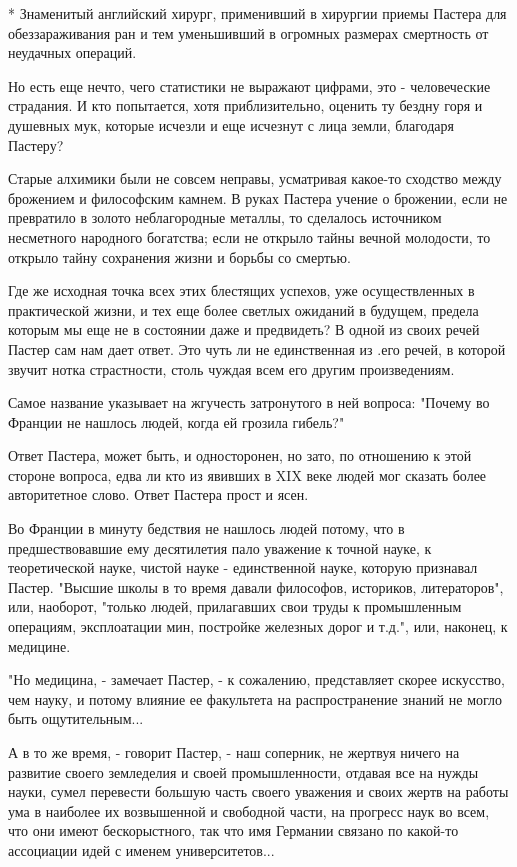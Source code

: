 * Знаменитый английский хирург, применивший в хирургии приемы Пастера
для обеззараживания ран и тем уменьшивший в огромных размерах
смертность от неудачных операций.

Но  есть  еще  нечто,  чего  статистики  не  выражают  цифрами,  это   -
человеческие страдания. И кто  попытается, хотя приблизительно,  оценить
ту бездну горя  и душевных мук,  которые исчезли и  еще исчезнут с  лица
земли, благодаря Пастеру?

Старые алхимики  были не  совсем неправы,  усматривая какое-то  сходство
между брожением и философским камнем. В руках Пастера учение о брожении,
если  не  превратило  в  золото  неблагородные  металлы,  то   сделалось
источником несметного народного богатства; если не открыло тайны  вечной
молодости, то открыло тайну сохранения жизни и борьбы со смертью.

Где же исходная точка всех этих блестящих успехов, уже осуществленных  в
практической жизни, и тех еще более светлых ожиданий в будущем,  предела
которым мы еще не в состоянии даже и предвидеть? В одной из своих  речей
Пастер сам нам дает ответ. Это чуть ли не единственная из .его речей,  в
которой  звучит  нотка  страстности,   столь  чуждая  всем  его   другим
произведениям.

Самое название указывает на жгучесть затронутого в ней вопроса:  "Почему
во Франции не нашлось людей, когда ей грозила гибель?"

Ответ Пастера, может быть, и односторонен, но зато, по отношению к  этой
стороне вопроса, едва  ли кто из  явивших в XIX  веке людей мог  сказать
более авторитетное слово. Ответ Пастера прост и ясен.

Во  Франции  в  минуту   бедствия  не  нашлось   людей  потому,  что   в
предшествовавшие  ему  десятилетия  пало  уважение  к  точной  науке,  к
теоретической  науке,  чистой  науке   -  единственной  науке,   которую
признавал Пастер. "Высшие школы в то время давали философов,  историков,
литераторов", или,  наоборот, "только  людей, прилагавших  свои труды  к
промышленным  операциям,  эксплоатации  мин,  постройке  железных  дорог
и т.д.", или, наконец, к медицине.

"Но медицина, - замечает Пастер, - к сожалению, представляет скорее
искусство, чем науку, и потому влияние ее факультета на
распространение знаний не могло быть ощутительным...

А в то же время, - говорит Пастер, - наш соперник, не жертвуя ничего
на развитие своего земледелия и своей промышленности, отдавая все на
нужды науки, сумел перевести большую часть своего уважения и своих
жертв на работы ума в наиболее их возвышенной и свободной части, на
прогресс наук во всем, что они имеют бескорыстного, так что имя
Германии связано по какой-то ассоциации идей с именем университетов...

